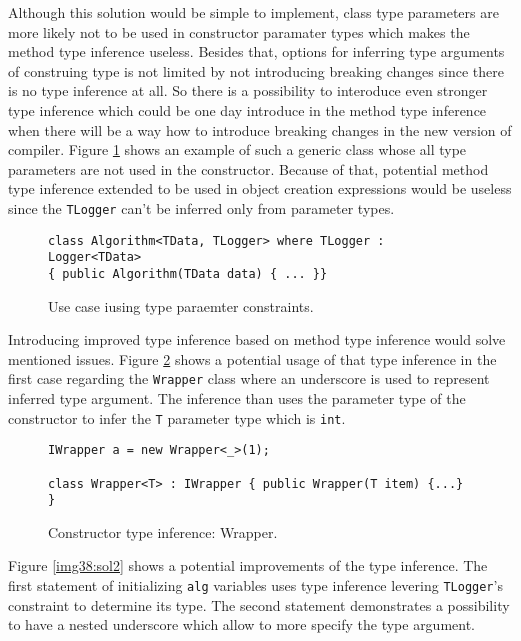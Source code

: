 Although this solution would be simple to implement, class type parameters are more likely not to be used in constructor paramater types which makes the method type inference useless.
Besides that, options for inferring type arguments of construing type is not limited by not introducing breaking changes since there is no type inference at all.
So there is a possibility to interoduce even stronger type inference which could be one day introduce in the method type inference when there will be a way how to introduce breaking changes in the new version of compiler.
Figure \ref{img36:cti} shows an example of such a generic class whose all type parameters are not used in the constructor.
Because of that, potential method type inference extended to be used in object creation expressions would be useless since the \texttt{TLogger} can't be inferred only from parameter types.
\begin{figure}[h]
\begin{lstlisting}[style=csharp]
class Algorithm<TData, TLogger> where TLogger : Logger<TData> 
{ public Algorithm(TData data) { ... }}
\end{lstlisting}
\caption{Use case iusing type paraemter constraints.}
\label{img36:cti}
\end{figure}
\par
{}
Introducing improved type inference based on method type inference would solve mentioned issues.
Figure \ref{img37:sol1} shows a potential usage of that type inference in the first case regarding the \texttt{Wrapper} class where an underscore is used to represent inferred type argument.
The inference than uses the parameter type of the constructor to infer the \texttt{T} parameter type which is \texttt{int}.
\begin{figure}[h]
\begin{lstlisting}[style=csharp]
IWrapper a = new Wrapper<_>(1);

class Wrapper<T> : IWrapper { public Wrapper(T item) {...} }
\end{lstlisting}
\caption{Constructor type inference: Wrapper.}
\label{img37:sol1}
\end{figure}
\par
{}
Figure \ref{img38:sol2} shows a potential improvements of the type inference.
The first statement of initializing \texttt{alg} variables uses type inference levering \texttt{TLogger}'s constraint to determine its type.
The second statement demonstrates a possibility to have a nested underscore which allow to more specify the type argument. 
